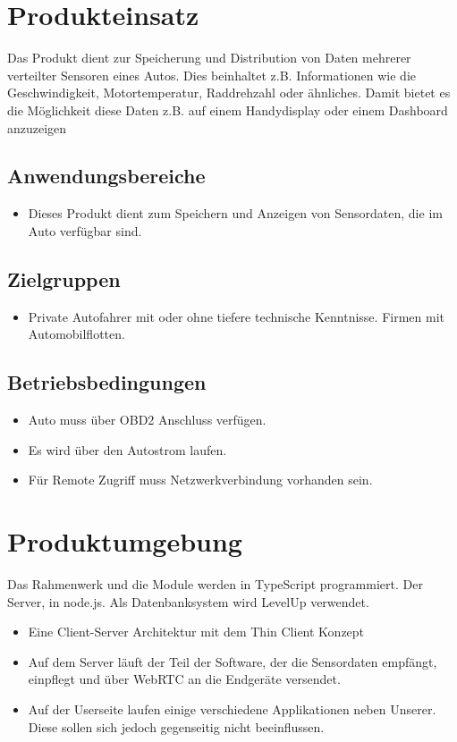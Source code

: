 \documentclass[pflichtenheft.tex]{subfiles}
\begin{document}
\chapter{Produkteinsatz}
Das Produkt dient zur Speicherung und Distribution von Daten mehrerer verteilter Sensoren eines Autos. Dies beinhaltet z.B. Informationen wie die Geschwindigkeit, Motortemperatur, Raddrehzahl oder ähnliches. Damit bietet es die Möglichkeit diese Daten z.B. auf einem Handydisplay oder einem Dashboard anzuzeigen


\section{Anwendungsbereiche}
\begin{itemize}
\item
Dieses Produkt dient zum Speichern und Anzeigen von Sensordaten, die im Auto verfügbar sind.
\end{itemize}


\section{Zielgruppen}
\begin{itemize}
\item
Private Autofahrer mit oder ohne tiefere technische Kenntnisse. Firmen mit Automobilflotten. 
\end{itemize}


\section{Betriebsbedingungen}
\begin{itemize}
\item
Auto muss über OBD2 Anschluss verfügen.
\item
Es wird über den Autostrom laufen.
\item
Für Remote Zugriff muss Netzwerkverbindung vorhanden sein.
\end{itemize}


\chapter{Produktumgebung}
Das Rahmenwerk und die Module werden in TypeScript programmiert. Der Server, in node.js. Als Datenbanksystem wird LevelUp verwendet.

\begin{itemize}

\item
Eine Client-Server Architektur mit dem Thin Client Konzept
\item
Auf dem Server läuft der Teil der Software, der die Sensordaten empfängt, einpflegt und über WebRTC an die Endgeräte versendet.
\item
Auf der Userseite laufen einige verschiedene Applikationen neben Unserer. Diese sollen sich jedoch gegenseitig nicht beeinflussen.
\end{itemize}
\end{document}
